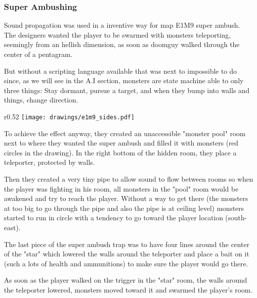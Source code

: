 \subsubsection{Super Ambushing}
Sound propagation was used in a inventive way for map E1M9 super ambush.  The designers wanted the player to be swarmed with monsters teleporting, seemingly from an hellish dimension, as soon as doomguy walked through the center of a pentagram.\\
\par
 But without a scripting language available that was next to impossible to do since, as we will see in the A.I section, monsters are state machine able to only three things: Stay dormant, pursue a target, and when they bump into walls and things, change direction.\\
\par
\begin{wrapfigure}[24]{r}{0.52\textwidth}
\centering
\texttt{[image: drawings/e1m9\_sides.pdf]}
\end{wrapfigure}

\par

To achieve the effect anyway, they created an unaccessible "monster pool" room next to where they wanted the super ambush and filled it with monsters (red circles in the drawing). In the right bottom of the hidden room, they place a teleporter, protected by walls.\\
\par
Then they created a very tiny pipe to allow sound to flow between rooms so when the player was fighting in his room, all monsters in the "pool" room would be awakened and try to reach the player. Without a way to get there (the monsters at too big to go through the pipe and also the pipe is at ceiling level) monsters started to run in circle with a tendency to go toward the player location (south-east).\\
\par
The last piece of the super ambush trap was to have four lines around the center of the "star" which lowered the walls around the teleporter and place a bait on it (such a lots of health and ammunitions) to make sure the player would go there.\\
\par

As soon as the player walked on the trigger in the "star" room, the walls around the teleporter lowered, monsters moved toward it and swarmed the player's room. \\
\par
{}







